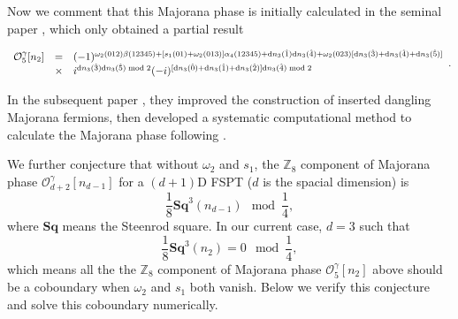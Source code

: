 \documentclass[%
 reprint,
 amsmath,amssymb,
 aps,
prb,
]{revtex4-2}
\begin{document}
Now we comment that this Majorana phase is initially calculated in the seminal paper \cite{Wang2020}, which only obtained a partial result 
\begin{widetext}
\begin{equation}
\begin{array}{ c c l }
\mathcal{O}_{5}^{\gamma }[ n_{2}] & = & ( -1)^{\omega_2(012) \beta(12345) + [s_1(01) +\omega_2(013)] \alpha_4(12345) + \mathrm{d} n_{3}(\hat{1})\mathrm{d} n_{3}(\hat{4}) +\omega _{2}( 023)[\mathrm{d} n_{3}(\hat{3}) +\mathrm{d} n_{3}(\hat{4}) +\mathrm{d} n_{3}(\hat{5})]}\\
& \times  & i^{\mathrm{d} n_{3}(\hat{3})\mathrm{d} n_{3}(\hat{5}) \bmod 2}( -i)^{[\mathrm{d} n_{3}(\hat{0}) +\mathrm{d} n_{3}(\hat{1}) +\mathrm{d} n_{3}(\hat{2})]\mathrm{d} n_{3}(\hat{4}) \bmod 2}
\end{array} .\label{eq:Majorana phase old}
\end{equation}
\end{widetext}
In the subsequent paper \cite{Ning2025unpub}, they improved the construction of inserted dangling Majorana fermions, then developed a systematic computational method to calculate the Majorana phase following \cite{ren2023stacking}.

We further conjecture that without $\omega_2$ and $s_1$, the $\mathbb Z_8$ component of Majorana phase $\mathcal{O}_{d+2}^{\gamma }[ n_{d-1}]$ for a $(d+1)$D FSPT ($d$ is the spacial dimension) is 
\begin{equation}
\frac{1}{8} \mathbf {Sq}^3(n_{d-1}) \mod \frac{1}{4} ,
\end{equation}
where $\mathbf {Sq}$ means the Steenrod square.
In our current case, $d = 3$ such that 
\begin{equation}
\frac{1}{8} \mathbf {Sq}^3(n_{2}) = 0 \mod \frac{1}{4} ,
\end{equation}
which means all the the $\mathbb Z_8$ component of Majorana phase $\mathcal{O}_{5}^{\gamma }[ n_{2}]$ above should be a coboundary when $\omega_2$ and $s_1$ both vanish.
Below we verify this conjecture and solve this coboundary numerically.
\end{document}
